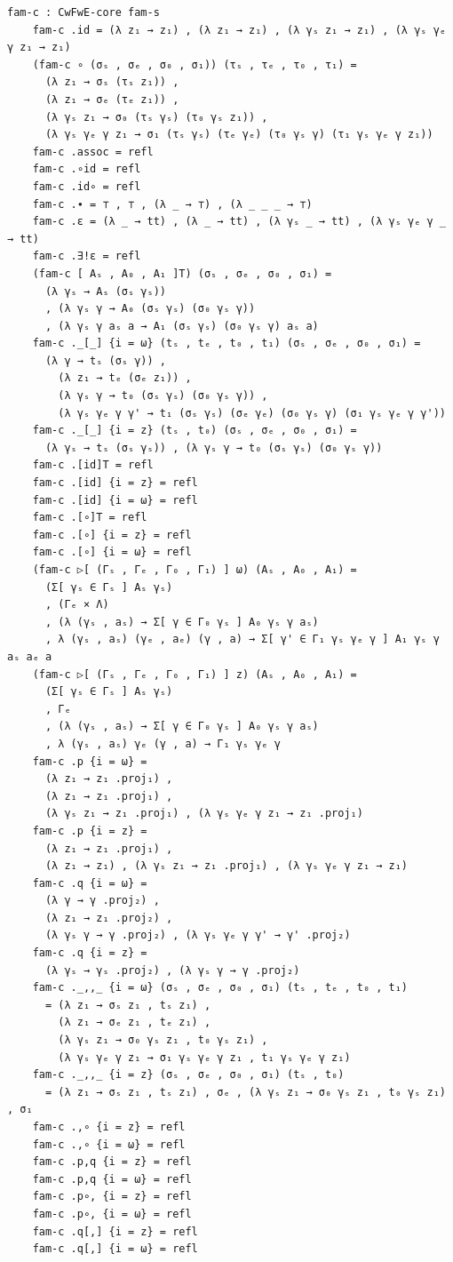 {\begin{Verbatim}[breaklines=true,breakanywhere=true,fontsize=\scriptsize]
    fam-c : CwFwE-core fam-s
    fam-c .id = (λ z₁ → z₁) , (λ z₁ → z₁) , (λ γₛ z₁ → z₁) , (λ γₛ γₑ γ z₁ → z₁)
    (fam-c ∘ (σₛ , σₑ , σ₀ , σ₁)) (τₛ , τₑ , τ₀ , τ₁) =
      (λ z₁ → σₛ (τₛ z₁)) ,
      (λ z₁ → σₑ (τₑ z₁)) ,
      (λ γₛ z₁ → σ₀ (τₛ γₛ) (τ₀ γₛ z₁)) ,
      (λ γₛ γₑ γ z₁ → σ₁ (τₛ γₛ) (τₑ γₑ) (τ₀ γₛ γ) (τ₁ γₛ γₑ γ z₁))
    fam-c .assoc = refl
    fam-c .∘id = refl
    fam-c .id∘ = refl
    fam-c .∙ = ⊤ , ⊤ , (λ _ → ⊤) , (λ _ _ _ → ⊤)
    fam-c .ε = (λ _ → tt) , (λ _ → tt) , (λ γₛ _ → tt) , (λ γₛ γₑ γ _ → tt)
    fam-c .∃!ε = refl
    (fam-c [ Aₛ , A₀ , A₁ ]T) (σₛ , σₑ , σ₀ , σ₁) =
      (λ γₛ → Aₛ (σₛ γₛ))
      , (λ γₛ γ → A₀ (σₛ γₛ) (σ₀ γₛ γ))
      , (λ γₛ γ aₛ a → A₁ (σₛ γₛ) (σ₀ γₛ γ) aₛ a)
    fam-c ._[_] {i = ω} (tₛ , tₑ , t₀ , t₁) (σₛ , σₑ , σ₀ , σ₁) =
      (λ γ → tₛ (σₛ γ)) ,
        (λ z₁ → tₑ (σₑ z₁)) ,
        (λ γₛ γ → t₀ (σₛ γₛ) (σ₀ γₛ γ)) ,
        (λ γₛ γₑ γ γ' → t₁ (σₛ γₛ) (σₑ γₑ) (σ₀ γₛ γ) (σ₁ γₛ γₑ γ γ'))
    fam-c ._[_] {i = z} (tₛ , t₀) (σₛ , σₑ , σ₀ , σ₁) =
      (λ γₛ → tₛ (σₛ γₛ)) , (λ γₛ γ → t₀ (σₛ γₛ) (σ₀ γₛ γ))
    fam-c .[id]T = refl
    fam-c .[id] {i = z} = refl
    fam-c .[id] {i = ω} = refl
    fam-c .[∘]T = refl
    fam-c .[∘] {i = z} = refl
    fam-c .[∘] {i = ω} = refl
    (fam-c ▷[ (Γₛ , Γₑ , Γ₀ , Γ₁) ] ω) (Aₛ , A₀ , A₁) =
      (Σ[ γₛ ∈ Γₛ ] Aₛ γₛ)
      , (Γₑ × Λ)
      , (λ (γₛ , aₛ) → Σ[ γ ∈ Γ₀ γₛ ] A₀ γₛ γ aₛ)
      , λ (γₛ , aₛ) (γₑ , aₑ) (γ , a) → Σ[ γ' ∈ Γ₁ γₛ γₑ γ ] A₁ γₛ γ aₛ aₑ a
    (fam-c ▷[ (Γₛ , Γₑ , Γ₀ , Γ₁) ] z) (Aₛ , A₀ , A₁) =
      (Σ[ γₛ ∈ Γₛ ] Aₛ γₛ)
      , Γₑ
      , (λ (γₛ , aₛ) → Σ[ γ ∈ Γ₀ γₛ ] A₀ γₛ γ aₛ)
      , λ (γₛ , aₛ) γₑ (γ , a) → Γ₁ γₛ γₑ γ
    fam-c .p {i = ω} =
      (λ z₁ → z₁ .proj₁) ,
      (λ z₁ → z₁ .proj₁) ,
      (λ γₛ z₁ → z₁ .proj₁) , (λ γₛ γₑ γ z₁ → z₁ .proj₁)
    fam-c .p {i = z} =
      (λ z₁ → z₁ .proj₁) ,
      (λ z₁ → z₁) , (λ γₛ z₁ → z₁ .proj₁) , (λ γₛ γₑ γ z₁ → z₁)
    fam-c .q {i = ω} =
      (λ γ → γ .proj₂) ,
      (λ z₁ → z₁ .proj₂) ,
      (λ γₛ γ → γ .proj₂) , (λ γₛ γₑ γ γ' → γ' .proj₂)
    fam-c .q {i = z} =
      (λ γₛ → γₛ .proj₂) , (λ γₛ γ → γ .proj₂)
    fam-c ._,,_ {i = ω} (σₛ , σₑ , σ₀ , σ₁) (tₛ , tₑ , t₀ , t₁)
      = (λ z₁ → σₛ z₁ , tₛ z₁) ,
        (λ z₁ → σₑ z₁ , tₑ z₁) ,
        (λ γₛ z₁ → σ₀ γₛ z₁ , t₀ γₛ z₁) ,
        (λ γₛ γₑ γ z₁ → σ₁ γₛ γₑ γ z₁ , t₁ γₛ γₑ γ z₁)
    fam-c ._,,_ {i = z} (σₛ , σₑ , σ₀ , σ₁) (tₛ , t₀)
      = (λ z₁ → σₛ z₁ , tₛ z₁) , σₑ , (λ γₛ z₁ → σ₀ γₛ z₁ , t₀ γₛ z₁) , σ₁
    fam-c .,∘ {i = z} = refl
    fam-c .,∘ {i = ω} = refl
    fam-c .p,q {i = z} = refl
    fam-c .p,q {i = ω} = refl
    fam-c .p∘, {i = z} = refl
    fam-c .p∘, {i = ω} = refl
    fam-c .q[,] {i = z} = refl
    fam-c .q[,] {i = ω} = refl


\end{Verbatim}}

